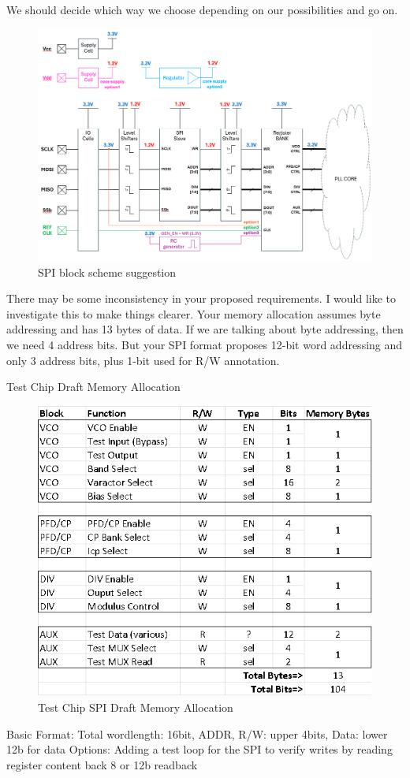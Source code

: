 We should decide which way we choose depending on our possibilities and go on.

\begin{figure}[ht!]
	\centering
	\includegraphics[width=0.5\linewidth]{Figures/spi-suggestion.png}
	\caption{SPI block scheme suggestion}
	\label{fig:spi-suggestion}
\end{figure}


There may be some inconsistency in your proposed requirements. I would like to investigate this to make things clearer.
Your memory allocation assumes byte addressing and has 13 bytes of data. If we are talking about byte addressing, then we need 4 address bits.
But your SPI format proposes 12-bit word addressing and only 3 address bits, plus 1-bit used for R/W annotation.

Test Chip Draft Memory Allocation


\begin{figure}[ht!]
	\centering
	\includegraphics[width=0.5\linewidth]{Figures/test-chip-spi-draft-memory-alloc.png}
	\caption{Test Chip SPI Draft Memory Allocation}
	\label{fig:test-chip-spi-draft-memoery-alloc}
\end{figure}


Basic Format:
Total wordlength: 16bit, 
ADDR, R/W: upper 4bits,
Data: lower 12b for data 
Options:
Adding a test loop for the SPI to verify writes by reading register content back
8 or 12b readback
 
